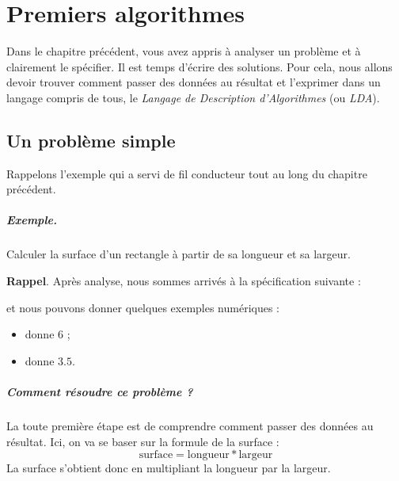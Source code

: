 \chapter{Premiers algorithmes}

	Dans le chapitre précédent,
	vous avez appris à analyser un problème
	et à clairement le spécifier.
	Il est temps d'écrire des solutions.
	Pour cela, nous allons devoir trouver
	comment passer des données au résultat
	et l'exprimer dans un langage compris de tous, 
	le \emph{Langage de Description d'Algorithmes} (ou \emph{LDA}).
	
	\section{Un problème simple}
	
		Rappelons l'exemple qui a servi de fil conducteur
		tout au long du chapitre précédent.
		
		\begin{Emphase}
			\paragraph{Exemple.}
			Calculer la surface d'un rectangle 
			à partir de sa longueur et sa largeur.
		
			\textbf{Rappel}. Après analyse, 
			nous sommes arrivés à la spécification suivante :
			\begin{center}
			\end{center}	
			et nous pouvons donner quelques exemples numériques :
			\begin{itemize}
			\item {} donne $6$ ;
			\item {} donne $3.5$.		
			\end{itemize}
		\end{Emphase}
		
		\paragraph{Comment résoudre ce problème ?} 
		La toute première étape est de comprendre comment passer des données
		au résultat. Ici, on va se baser sur la formule de la surface :
		\begin{equation}
			\textrm{surface} = \textrm{longueur} * \textrm{largeur}
		\end{equation}
		La surface s'obtient donc en multipliant la longueur par la largeur.
		
